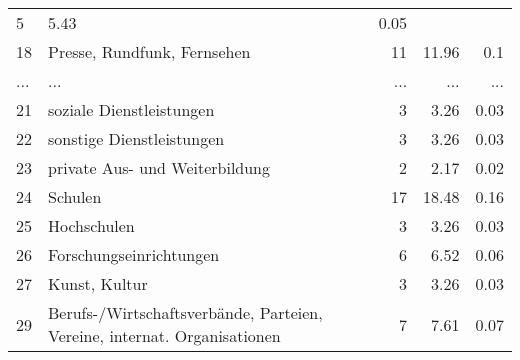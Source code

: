 \begin{longtable}{lXrrr}
          \num{5} &
          \num[round-mode=places,round-precision=2]{5.43} &
          \num[round-mode=places,round-precision=2]{0.05} \\
        18 & \multicolumn{1}{X}{Presse, Rundfunk, Fernsehen} & %
          \num{11} &
          \num[round-mode=places,round-precision=2]{11.96} &
          \num[round-mode=places,round-precision=2]{0.1} \\
       ... & ... & ... & ... & ... \\
        21 & \multicolumn{1}{X}{soziale Dienstleistungen} & %
          \num{3} &
          \num[round-mode=places,round-precision=2]{3.26} &
          \num[round-mode=places,round-precision=2]{0.03} \\

        22 & \multicolumn{1}{X}{sonstige Dienstleistungen} & %
          \num{3} &
          \num[round-mode=places,round-precision=2]{3.26} &
          \num[round-mode=places,round-precision=2]{0.03} \\

        23 & \multicolumn{1}{X}{private Aus- und Weiterbildung} & %
          \num{2} &
          \num[round-mode=places,round-precision=2]{2.17} &
          \num[round-mode=places,round-precision=2]{0.02} \\

        24 & \multicolumn{1}{X}{Schulen} & %
          \num{17} &
          \num[round-mode=places,round-precision=2]{18.48} &
          \num[round-mode=places,round-precision=2]{0.16} \\

        25 & \multicolumn{1}{X}{Hochschulen} & %
          \num{3} &
          \num[round-mode=places,round-precision=2]{3.26} &
          \num[round-mode=places,round-precision=2]{0.03} \\

        26 & \multicolumn{1}{X}{Forschungseinrichtungen} & %
          \num{6} &
          \num[round-mode=places,round-precision=2]{6.52} &
          \num[round-mode=places,round-precision=2]{0.06} \\

        27 & \multicolumn{1}{X}{Kunst, Kultur} & %
          \num{3} &
          \num[round-mode=places,round-precision=2]{3.26} &
          \num[round-mode=places,round-precision=2]{0.03} \\

        29 & \multicolumn{1}{X}{Berufs-/Wirtschaftsverbände, Parteien, Vereine, internat. Organisationen} & %
          \num{7} &
          \num[round-mode=places,round-precision=2]{7.61} &
          \num[round-mode=places,round-precision=2]{0.07} \\


\end{longtable}
